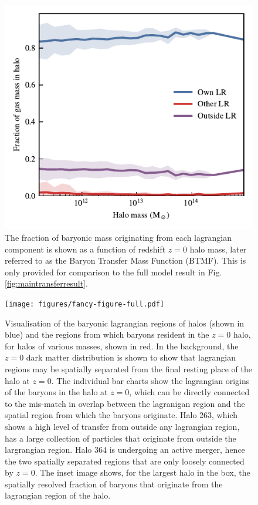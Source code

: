 \begin{figure}
	\centering
	\includegraphics[width=\columnwidth]{figures/s50gadget/component_fraction_vs_halo_mass_gas.pdf}
	\vspace{-0.7cm}
	\caption{
	The fraction of baryonic mass originating from each lagrangian component is
	shown as a function of redshift $z=0$ halo mass, later referred to as the
	Baryon Transfer Mass Function (BTMF). This is only provided for comparison to
	the full model result in Fig. \ref{fig:maintransferresult}.
	}
	\label{fig:nonradiativetransfer}
\end{figure}

\begin{figure}
	\centering
	\vspace{1cm}
	\texttt{[image: figures/fancy-figure-full.pdf]}
	\caption{
  Visualisation of the baryonic lagrangian regions of halos (shown in blue)
  and the regions from which baryons resident in the $z=0$ halo, for halos of
  various masses, shown in red. In the background, the $z=0$ dark matter
  distribution is shown to show that lagrangian regions may be spatially
  separated from the final resting place of the halo at $z=0$. The individual
  bar charts show the lagrangian origins of the baryons in the halo at $z=0$,
  which can be directly connected to the mis-match in overlap between the
  lagranigan region and the spatial region from which the baryons originate.
  Halo 263, which shows a high level of transfer from outside any lagrangian
  region, has a large collection of particles that originate from outside the
  largrangian region. Halo $364$ is undergoing an active merger, hence the
  two spatially separated regions that are only loosely connected by $z=0$.
  The inset image shows, for the largest halo in the box, the spatially
  resolved fraction of baryons that originate from the lagrangian region of
  the halo.
	}
	\vspace{1cm}
	\label{fig:bigtransferpic}
\end{figure}

